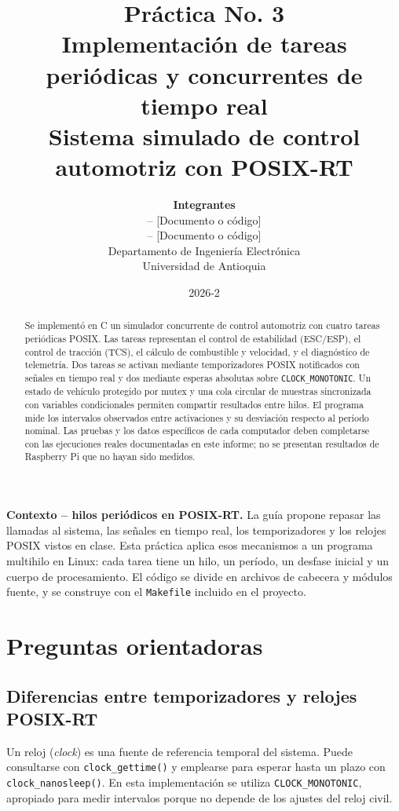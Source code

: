 \documentclass[12pt,a4paper]{article}
\title{
  \textbf{Práctica No. 3}\\
  Implementación de tareas periódicas y concurrentes de tiempo real\\[0.5em]
  \large Sistema simulado de control automotriz con POSIX-RT
}
\author{
  \textbf{Integrantes}\\
  [Nombre completo del estudiante 1] -- [Documento o código]\\
  [Nombre completo del estudiante 2] -- [Documento o código]\\[0.8em]
  Departamento de Ingeniería Electrónica\\
  Universidad de Antioquia
}
\date{2026-2}
\begin{document}
\maketitle
\thispagestyle{empty}
\vspace{1em}

\begin{abstract}
Se implementó en C un simulador concurrente de control automotriz con cuatro tareas periódicas POSIX. Las tareas representan el control de estabilidad (ESC/ESP), el control de tracción (TCS), el cálculo de combustible y velocidad, y el diagnóstico de telemetría. Dos tareas se activan mediante temporizadores POSIX notificados con señales en tiempo real y dos mediante esperas absolutas sobre \texttt{CLOCK\_MONOTONIC}. Un estado de vehículo protegido por mutex y una cola circular de muestras sincronizada con variables condicionales permiten compartir resultados entre hilos. El programa mide los intervalos observados entre activaciones y su desviación respecto al período nominal. Las pruebas y los datos específicos de cada computador deben completarse con las ejecuciones reales documentadas en este informe; no se presentan resultados de Raspberry Pi que no hayan sido medidos.
\end{abstract}

\tableofcontents
\newpage

\textbf{Contexto -- hilos periódicos en POSIX-RT.}
La guía propone repasar las llamadas al sistema, las señales en tiempo real, los temporizadores y los relojes POSIX vistos en clase. Esta práctica aplica esos mecanismos a un programa multihilo en Linux: cada tarea tiene un hilo, un período, un desfase inicial y un cuerpo de procesamiento. El código se divide en archivos de cabecera y módulos fuente, y se construye con el \texttt{Makefile} incluido en el proyecto.

\section{Preguntas orientadoras}

\subsection{Diferencias entre temporizadores y relojes POSIX-RT}

Un reloj (\textit{clock}) es una fuente de referencia temporal del sistema. Puede consultarse con \texttt{clock\_gettime()} y emplearse para esperar hasta un plazo con \texttt{clock\_nanosleep()}. En esta implementación se utiliza \texttt{CLOCK\_MONOTONIC}, apropiado para medir intervalos porque no depende de los ajustes del reloj civil.
\end{document}
